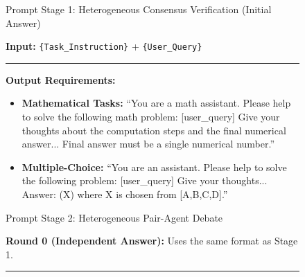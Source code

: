 \documentclass[11pt]{article}
\begin{document}
\begin{figure}[t]
    \centering

    \begin{promptbox}{Prompt Stage 1: Heterogeneous Consensus Verification (Initial Answer)}
        \footnotesize
        \setlength{\parskip}{2pt}
        \setlength{\parindent}{0pt}

        \textbf{Input:} \texttt{\{{Task\_Instruction\}}} + \texttt{\{{User\_Query\}}}

        \vspace{3pt}\hrule\vspace{3pt}

        \textbf{Output Requirements:}
        \begin{itemize}[leftmargin=1.5em]
            \item \textbf{Mathematical Tasks:}
            ``You are a math assistant. Please help to solve the following math problem: [user\_query]
            Give your thoughts about the computation steps and the final numerical answer...
            Final answer must be a single numerical number.''

            \item \textbf{Multiple-Choice:}
            ``You are an assistant. Please help to solve the following problem: [user\_query]
            Give your thoughts... Answer: (X) where X is chosen from [A,B,C,D].''


        \end{itemize}
    \end{promptbox}

    \begin{promptbox}{Prompt Stage 2: Heterogeneous Pair-Agent Debate}
        \footnotesize
        \setlength{\parskip}{2pt}
        \setlength{\parindent}{0pt}

        \textbf{Round 0 (Independent Answer):} Uses the same format as Stage 1.

        \vspace{3pt}\hrule\vspace{3pt}


\end{promptbox}
\end{figure}
\end{document}
